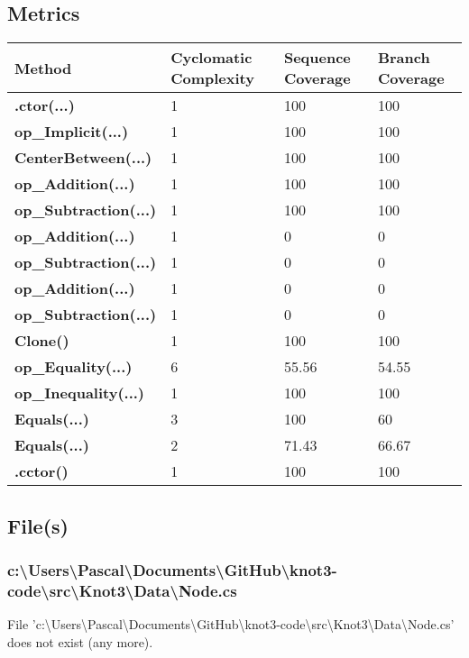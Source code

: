 \documentclass[a4paper,10pt]{article}
\begin{document}
\subsection{Metrics}
\begin{longtable}[l]{|l|l|l|l|}
\hline
\textbf{Method} & \textbf{Cyclomatic Complexity} & \textbf{Sequence Coverage} & \textbf{Branch Coverage}\\
\hline
\textbf{.ctor(...)} & 1 & 100 & 100\\
\hline
\textbf{op\_Implicit(...)} & 1 & 100 & 100\\
\hline
\textbf{CenterBetween(...)} & 1 & 100 & 100\\
\hline
\textbf{op\_Addition(...)} & 1 & 100 & 100\\
\hline
\textbf{op\_Subtraction(...)} & 1 & 100 & 100\\
\hline
\textbf{op\_Addition(...)} & 1 & 0 & 0\\
\hline
\textbf{op\_Subtraction(...)} & 1 & 0 & 0\\
\hline
\textbf{op\_Addition(...)} & 1 & 0 & 0\\
\hline
\textbf{op\_Subtraction(...)} & 1 & 0 & 0\\
\hline
\textbf{Clone()} & 1 & 100 & 100\\
\hline
\textbf{op\_Equality(...)} & 6 & 55.56 & 54.55\\
\hline
\textbf{op\_Inequality(...)} & 1 & 100 & 100\\
\hline
\textbf{Equals(...)} & 3 & 100 & 60\\
\hline
\textbf{Equals(...)} & 2 & 71.43 & 66.67\\
\hline
\textbf{.cctor()} & 1 & 100 & 100\\
\hline
\end{longtable}
\subsection{File(s)}
\subsubsection{c:\textbackslash Users\textbackslash Pascal\textbackslash Documents\textbackslash GitHub\textbackslash knot3-code\textbackslash src\textbackslash Knot3\textbackslash Data\textbackslash Node.cs}
 File 'c:\textbackslash Users\textbackslash Pascal\textbackslash Documents\textbackslash GitHub\textbackslash knot3-code\textbackslash src\textbackslash Knot3\textbackslash Data\textbackslash Node.cs' does not exist (any more).
\newpage
\end{document}
